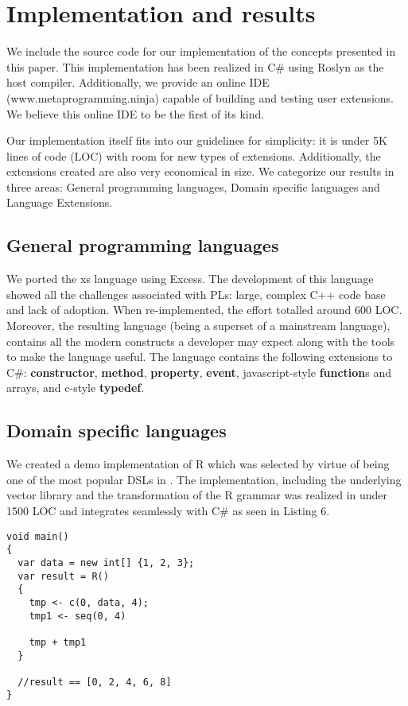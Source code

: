 \documentclass[conference]{IEEEtran}
\begin{document}
\section{Implementation and results}

We include the source code for our implementation \cite{Excess} of the concepts presented in this paper. This implementation has been realized in C\# using Roslyn \cite{Roslyn} as the host compiler. Additionally, we provide an online IDE (www.metaprogramming.ninja) capable of building and testing user extensions. We believe this online IDE to be the first of its kind.

Our implementation itself fits into our guidelines for simplicity: it is under 5K lines of code (LOC) with room for new types of extensions. Additionally, the extensions created are also very economical in size. We categorize our results in three areas: General programming languages, Domain specific languages and Language Extensions.

\subsection{General programming languages}

We ported the xs language \cite{XKP} using Excess. The development of this language showed all the challenges associated with PLs: large, complex C++ code base and lack of adoption.  
When re-implemented, the effort totalled around 600 LOC. Moreover, the resulting language (being a superset of a mainstream language), contains all the modern constructs a developer may expect along with the tools
to make the language useful. The language contains the following extensions to C\#: \textbf{constructor}, \textbf{method}, \textbf{property}, \textbf{event}, javascript-style \textbf{function}s and arrays, and c-style \textbf{typedef}.

\subsection{Domain specific languages}

We created a demo implementation of R \cite{R} which was selected by virtue of being one of the most popular DSLs in \cite{Tiobe}. The implementation, including the underlying vector library and the transformation of the R grammar
was realized in under 1500 LOC and integrates seamlessly with C\# as seen in Listing 6.

\begin{lstlisting}[caption=R extension, captionpos= b, basicstyle=\small]
void main()
{
  var data = new int[] {1, 2, 3};
  var result = R()
  {
    tmp <- c(0, data, 4);
    tmp1 <- seq(0, 4)

    tmp + tmp1  
  }

  //result == [0, 2, 4, 6, 8]
}
\end{lstlisting}
\end{document}
